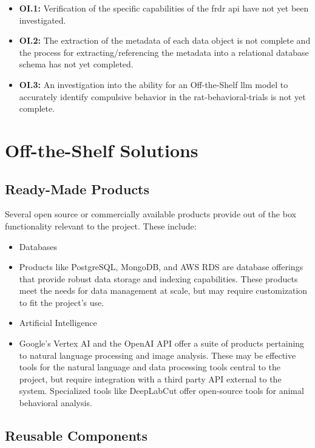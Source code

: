 \documentclass[12pt]{article}
\begin{document}
\begin{itemize}
    \item \textbf{OI.1:} Verification of the specific capabilities of the \gls{frdr} \gls{api} have not yet been investigated.
    \item \textbf{OI.2:} The extraction of the metadata of each data object is not complete and the process for extracting/referencing the metadata
    into a relational database schema has not yet completed.
    \item \textbf{OI.3:} An investigation into the ability for an Off-the-Shelf \gls{llm} model to accurately identify compulsive behavior in the
    \gls{rat-behavioral-trials} is not yet complete.
\end{itemize}

\section{Off-the-Shelf Solutions}
\subsection{Ready-Made Products}

Several open source or commercially available products provide out of the box functionality relevant to the project. These include: 

\begin{itemize}
    \item Databases 
    \item[] Products like PostgreSQL, MongoDB, and AWS RDS are database offerings that provide robust data storage and indexing capabilities. These products meet the needs for data management at scale, but may require customization to fit the project's use. 
    \item Artificial Intelligence 
    \item[] Google's Vertex AI and the OpenAI API offer a suite of products pertaining to natural language processing and image analysis. These may be effective tools for the natural language and data processing tools central to the project, but require integration with a third party API external to the system. Specialized tools like DeepLabCut \cite{GitHub_RatBAT} offer open-source tools for animal behavioral analysis. 

\end{itemize}



\subsection{Reusable Components}
\end{document}
